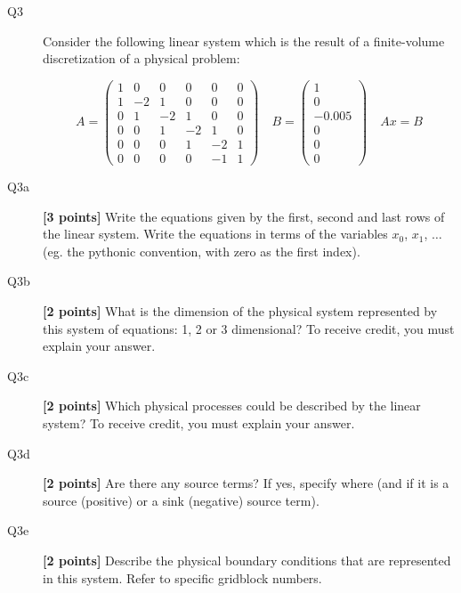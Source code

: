 \documentclass{article}
\begin{document}
\begin{description}


\item[Q3] Consider the following linear system which is the result of a finite-volume discretization of a physical problem:

\begin{equation}
A = \left( \begin{array}{cccccc}
    1 & 0 & 0 & 0 & 0 & 0 \\
    1 & -2 & 1 & 0 & 0 & 0 \\
    0 & 1 & -2 & 1  & 0 & 0 \\
    0 & 0 & 1 & -2 & 1  & 0 \\
    0 & 0 & 0 & 1 & -2 & 1  \\
    0 & 0 & 0 & 0 & -1 & 1 
\end{array}
\right) \quad B = \left( \begin{array}{c}
    1  \\
    0 \\
    -0.005 \\
    0  \\
    0  \\
    0  
\end{array} \right)  \quad Ax=B
\end{equation} 


\item [Q3a]  \textbf{[3 points]} Write the equations given by the first, second and last rows of the linear system. Write the equations in terms of the variables $x_0$, $x_1$, $\ldots$ (eg. the pythonic convention, with zero as the first index).

\vspace{2cm}
\item [Q3b]  \textbf{[2 points]} What is the dimension of the physical system represented by this system of equations: 1, 2 or 3 dimensional? To receive credit, you must explain your answer.  
\vspace{2cm}

\item [Q3c] \textbf{[2 points]} Which physical processes could be described by the linear system?  To receive credit, you must explain your answer.
\vspace{2cm}

\item [Q3d]  \textbf{[2 points]} Are there any source terms? If yes, specify where (and if it is a source (positive) or a sink (negative) source term).
\vspace{2cm}

\item [Q3e]  \textbf{[2 points]}  Describe the physical boundary conditions that are represented in this system. Refer to specific gridblock  numbers.
\vspace{2.0cm}




\end{description}
\end{document}

